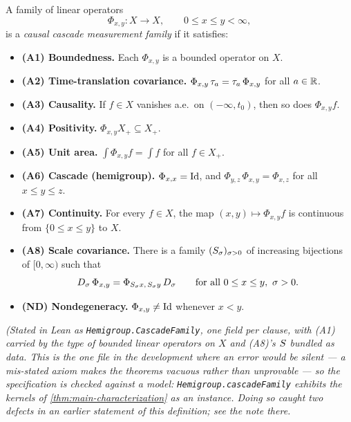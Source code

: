 \begin{definition}\label{def:cascade-family}
\leanok
A family of linear operators
\[
  \Phi_{x,y} : X \to X, \qquad 0 \le x \le y < \infty,
\]
is a \emph{causal cascade measurement family} if it satisfies:
\begin{itemize}
\item \textbf{(A1) Boundedness.} Each $\Phi_{x,y}$ is a bounded operator on $X$.
\item \textbf{(A2) Time-translation covariance.} $\Phi_{x,y}\,\tau_a = \tau_a\,\Phi_{x,y}$
for all $a \in \mathbb{R}$.
\item \textbf{(A3) Causality.} If $f \in X$ vanishes a.e.\ on $(-\infty, t_0)$, then so does
$\Phi_{x,y} f$.
\item \textbf{(A4) Positivity.} $\Phi_{x,y} X_+ \subseteq X_+$.
\item \textbf{(A5) Unit area.} $\int \Phi_{x,y} f = \int f$ for all $f \in X_+$.
\item \textbf{(A6) Cascade (hemigroup).} $\Phi_{x,x} = \mathrm{Id}$, and
$\Phi_{y,z}\,\Phi_{x,y} = \Phi_{x,z}$ for all $x \le y \le z$.
\item \textbf{(A7) Continuity.} For every $f \in X$, the map $(x,y) \mapsto \Phi_{x,y} f$ is
continuous from $\{0 \le x \le y\}$ to $X$.
\item \textbf{(A8) Scale covariance.} There is a family $(S_\sigma)_{\sigma > 0}$ of
increasing bijections of $[0,\infty)$ such that
\[
  D_\sigma\,\Phi_{x,y} = \Phi_{S_\sigma x,\,S_\sigma y}\,D_\sigma
  \qquad \text{for all } 0 \le x \le y,\ \sigma > 0.
\]
\item \textbf{(ND) Nondegeneracy.} $\Phi_{x,y} \ne \mathrm{Id}$ whenever $x < y$.
\end{itemize}
\statusT\quad\emph{(Stated in Lean as \texttt{Hemigroup.CascadeFamily}, one field per clause,
with (A1) carried by the type of bounded linear operators on $X$ and (A8)'s $S$ bundled as
data. This is the one file in the development where an error would be silent --- a mis-stated
axiom makes the theorems vacuous rather than unprovable --- so the specification is checked
against a model: \texttt{Hemigroup.cascadeFamily} exhibits the kernels of
\ref{thm:main-characterization} as an instance. Doing so caught two defects in an earlier
statement of this definition; see the note there.}


\end{definition}
